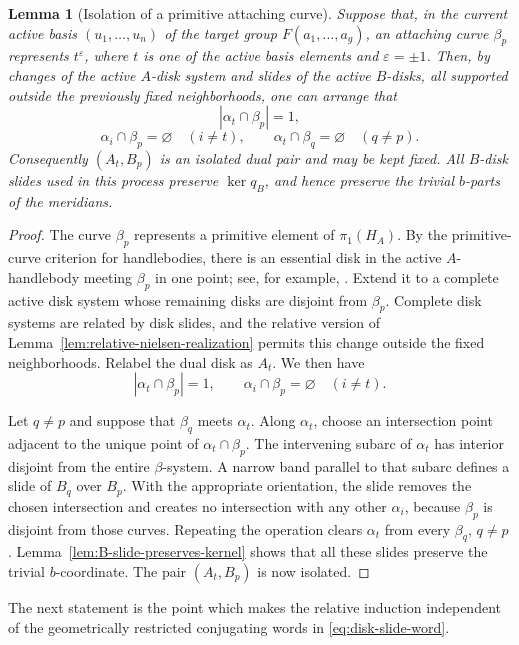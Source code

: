 \documentclass{article}
\newtheorem{lm}[theorem]{Lemma}
\begin{document}
\begin{lm}[Isolation of a primitive attaching curve]
\label{lem:geometric-singleton-cancellation}
Suppose that, in the current active  basis
\((u_1,\ldots,u_n)\) of the target group $F(a_1,\ldots ,a_g)$, an attaching curve \(\beta_p\) represents
\(t^{\varepsilon}\), where \(t\) is one of the active basis elements and
\(\varepsilon=\pm1\).  Then, by changes of the active \(A\)-disk system and
slides of the active \(B\)-disks, all supported outside the previously fixed
neighborhoods, one can arrange that
\[
 |\alpha_t\cap\beta_p|=1,
\]
\[
 \alpha_i\cap\beta_p=\varnothing\quad(i\neq t),
 \qquad
 \alpha_t\cap\beta_q=\varnothing\quad(q\neq p).
\]
Consequently \((A_t,B_p)\) is an isolated dual pair and may be kept fixed.
All \(B\)-disk slides used in this process preserve \(\ker q_B\), and hence
preserve the trivial \(b\)-parts of the meridians.
\end{lm}

\begin{proof}
The curve \(\beta_p\) represents a primitive element of
\(\pi_1(H_A)\).  By the primitive-curve criterion for handlebodies, there is
an essential disk in the active \(A\)-handlebody meeting \(\beta_p\) in one
point; see, for example, \cite{H,Moriah}.  Extend it to a complete active disk
system whose remaining disks are disjoint from \(\beta_p\).  Complete disk
systems are related by disk slides, and the relative version of
Lemma~\ref{lem:relative-nielsen-realization} permits this change outside the
fixed neighborhoods.  Relabel the dual disk as \(A_t\).  We then have
\[
 |\alpha_t\cap\beta_p|=1,
 \qquad
 \alpha_i\cap\beta_p=\varnothing\quad(i\neq t).
\]

Let \(q\neq p\) and suppose that \(\beta_q\) meets \(\alpha_t\).  Along
\(\alpha_t\), choose an intersection point adjacent to the unique point of
\(\alpha_t\cap\beta_p\).  The intervening subarc of \(\alpha_t\) has interior
disjoint from the entire \(\beta\)-system.  A narrow band parallel to that
subarc defines a slide of \(B_q\) over \(B_p\).  With the appropriate
orientation, the slide removes the chosen intersection and creates no
intersection with any other \(\alpha_i\), because \(\beta_p\) is disjoint
from those curves.  Repeating the operation clears \(\alpha_t\) from every
\(\beta_q\), \(q\neq p\).  Lemma~\ref{lem:B-slide-preserves-kernel} shows that
all these slides preserve the trivial \(b\)-coordinate.  The pair
\((A_t,B_p)\) is now isolated.
\end{proof}

The next statement is the point which makes the relative induction
independent of the geometrically restricted conjugating words in
\eqref{eq:disk-slide-word}.
\end{document}
